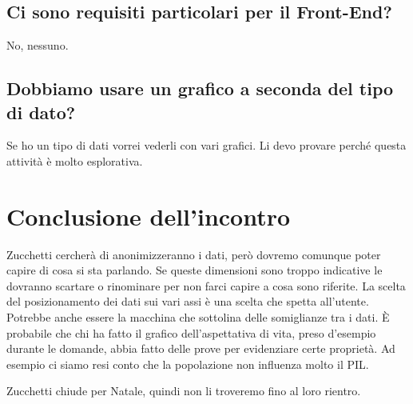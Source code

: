 \documentclass{article}
\begin{document}
    \subsection{Ci sono requisiti particolari per il Front-End?}
    \label{sub:domanda_18}
    No, nessuno.

    \subsection{Dobbiamo usare un grafico a seconda del tipo di dato?}
    \label{sub:domanda_19}
    Se ho un tipo di dati vorrei vederli con vari grafici. Li devo provare perché questa attività è molto esplorativa.

\section{Conclusione dell'incontro}
\label{sec:conclusione}
Zucchetti cercherà di anonimizzeranno i dati, però dovremo comunque poter capire di cosa si sta parlando. Se queste dimensioni sono troppo indicative le dovranno scartare o rinominare per non farci capire a cosa sono riferite. La scelta del posizionamento dei dati sui vari assi è una scelta che spetta all'utente. Potrebbe anche essere la macchina che sottolina delle somiglianze tra i dati. È probabile che chi ha fatto il grafico dell'aspettativa di vita, preso d'esempio durante le domande, abbia fatto delle prove per evidenziare certe proprietà. Ad esempio ci siamo resi conto che la popolazione non influenza molto il PIL.

Zucchetti chiude per Natale, quindi non li troveremo fino al loro rientro.
\end{document}

